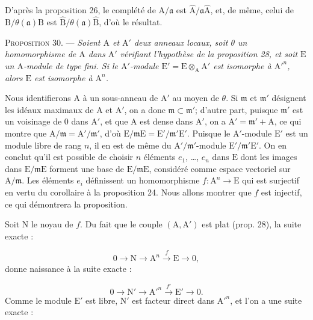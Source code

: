 D'après la proposition 26, le complété de $\mathrm{A}/\mathfrak{a}$ est $\hat{\mathrm{A}}/\mathfrak{a}\hat{\mathrm{A}}$, et, de même, celui de $\mathrm{B}/\theta(\mathfrak{a})\mathrm{B}$ est $\hat{\mathrm{B}}/\theta(\mathfrak{a})\hat{\mathrm{B}}$, d'où le résultat.

\textsc{Proposition} 30. --- \emph{Soient $\mathrm{A}$ et $\mathrm{A}'$ deux anneaux locaux, soit $\theta$ un homomorphisme de $\mathrm{A}$ dans $\mathrm{A}'$ vérifiant l'hypothèse de la proposition 28, et soit $\mathrm{E}$ un $\mathrm{A}$-module de type fini. Si le $\mathrm{A}'$-module $\mathrm{E}' = \mathrm{E} \otimes_\mathrm{A} \mathrm{A}'$ est isomorphe à ${\mathrm{A}'}^n$, alors $\mathrm{E}$ est isomorphe à $\mathrm{A}^n$.}

Nous identifierons $\mathrm{A}$ à un sous-anneau de $\mathrm{A}'$ au moyen de $\theta$. Si $\mathfrak{m}$ et $\mathfrak{m}'$ désignent les idéaux maximaux de $\mathrm{A}$ et $\mathrm{A}'$, on a donc $\mathfrak{m} \subset \mathfrak{m}'$; d'autre part, puisque $\mathfrak{m}'$ est un voisinage de $0$ dans $\mathrm{A}'$, et que $\mathrm{A}$ est dense dans $\mathrm{A}'$, on a $\mathrm{A}' = \mathfrak{m}' + \mathrm{A}$, ce qui montre que $\mathrm{A}/\mathfrak{m} = \mathrm{A}'/\mathfrak{m}'$, d'où $\mathrm{E}/\mathfrak{m}\mathrm{E} = \mathrm{E}'/\mathfrak{m}'\mathrm{E}'$. Puisque le $\mathrm{A}'$-module $\mathrm{E}'$ est un module libre de rang $n$, il en est de même du $\mathrm{A}'/\mathfrak{m}'$-module $\mathrm{E}'/\mathfrak{m}'\mathrm{E}'$. On en conclut qu'il est possible de choisir $n$ éléments $e_1$, \ldots, $e_n$ dans $\mathrm{E}$ dont les images dans $\mathrm{E}/\mathfrak{m}\mathrm{E}$ forment une base de $\mathrm{E}/\mathfrak{m}\mathrm{E}$, considéré comme espace vectoriel sur $\mathrm{A}/\mathfrak{m}$. Les éléments $e_i$ définissent un homomorphisme $f : \mathrm{A}^n \to \mathrm{E}$ qui est surjectif en vertu du corollaire à la proposition 24. Nous allons montrer que $f$ est injectif, ce qui démontrera la proposition.

Soit $\mathrm{N}$ le noyau de $f$. Du fait que le couple $(\mathrm{A}, \mathrm{A}')$ est plat (prop. 28), la suite exacte :

\begin{equation*}
0 \to \mathrm{N} \to \mathrm{A}^n \xrightarrow{\,f\,} \mathrm{E} \to 0,
\end{equation*}
donne naissance à la suite exacte :

\begin{equation*}
0 \longrightarrow \mathrm{N}' \longrightarrow \mathrm{A}'^n \xrightarrow{\ f'\ } \mathrm{E}' \longrightarrow 0.
\end{equation*}
Comme le module $\mathrm{E}'$ est libre, $\mathrm{N}'$ est facteur direct dans $\mathrm{A}'^n$, et l'on a une suite exacte :

